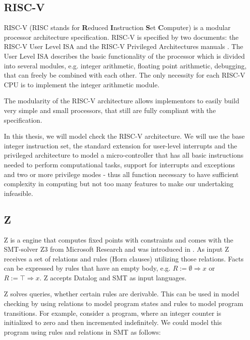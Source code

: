 \documentclass{securem}
\newcommand{\muZ}{{\textmu}Z}
\begin{document}
\subsection{RISC-V}

RISC-V (RISC stands for \textbf{R}educed \textbf{I}nstruction \textbf{S}et \textbf{C}omputer) is a modular processor architecture specification.
RISC-V is specified by two documents: the RISC-V User Level ISA \cite{RiscVISA} and the RISC-V Privileged Architectures manuals \cite{RiscVISAP}.
The User Level ISA describes the basic functionality of the processor which is divided into several modules, e.g. integer arithmetic, floating point arithmetic, debugging, that can freely be combined with each other.
The only necessity for each RISC-V CPU is to implement the integer arithmetic module.

The modularity of the RISC-V architecture allows implementors to easily build very simple and small processors, that still are fully compliant with the specification.

In this thesis, we will model check the RISC-V architecture.
We will use the base integer instruction set, the standard extension for user-level interrupts and the privileged architecture to model a micro-controller that has all basic instructions needed to perform computational tasks, support for interrupts and exceptions and two or more privilege modes - thus all function necessary to have sufficient complexity in computing but not too many features to make our undertaking infeasible.

\subsection{\muZ{}}

\muZ{} is a engine that computes fixed points with constraints and comes with the SMT-solver Z3 from Microsoft Research and was introduced in \cite{Hoder11}.
As input \muZ{} receives a set of relations and rules (Horn clauses) utilizing those relations.
Facts can be expressed by rules that have an empty body, e.g. $ R := \emptyset \Rightarrow x $ or $ R := \top \Rightarrow x $.
\muZ{} accepts Datalog and SMT as input languages.

\muZ{} solves queries, whether certain rules are derivable.
This can be used in model checking by using relations to model program states and rules to model program transitions.
For example, consider a program, where an integer counter is initialized to zero and then incremented indefinitely.
We could model this program using rules and relations in SMT as follows:
\end{document}
